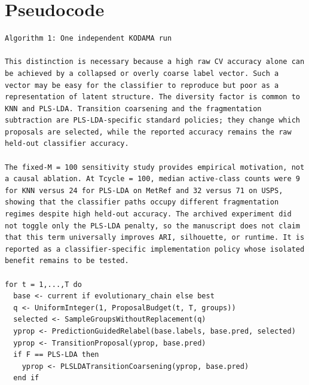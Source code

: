 \documentclass[twoside,11pt]{article}
\begin{document}
\section{Pseudocode}
\begin{small}
\begin{verbatim}
Algorithm 1: One independent KODAMA run

This distinction is necessary because a high raw CV accuracy alone can be achieved by a collapsed or overly coarse label vector. Such a vector may be easy for the classifier to reproduce but poor as a representation of latent structure. The diversity factor is common to KNN and PLS-LDA. Transition coarsening and the fragmentation subtraction are PLS-LDA-specific standard policies; they change which proposals are selected, while the reported accuracy remains the raw held-out classifier accuracy.

The fixed-M = 100 sensitivity study provides empirical motivation, not a causal ablation. At Tcycle = 100, median active-class counts were 9 for KNN versus 24 for PLS-LDA on MetRef and 32 versus 71 on USPS, showing that the classifier paths occupy different fragmentation regimes despite high held-out accuracy. The archived experiment did not toggle only the PLS-LDA penalty, so the manuscript does not claim that this term universally improves ARI, silhouette, or runtime. It is reported as a classifier-specific implementation policy whose isolated benefit remains to be tested.

for t = 1,...,T do
  base <- current if evolutionary_chain else best
  q <- UniformInteger(1, ProposalBudget(t, T, groups))
  selected <- SampleGroupsWithoutReplacement(q)
  yprop <- PredictionGuidedRelabel(base.labels, base.pred, selected)
  yprop <- TransitionProposal(yprop, base.pred)
  if F == PLS-LDA then
    yprop <- PLSLDATransitionCoarsening(yprop, base.pred)
  end if


\end{verbatim}
\end{small}
\end{document}
